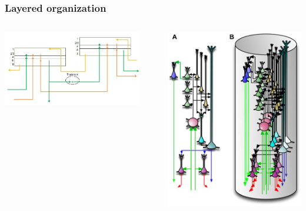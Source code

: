\documentclass[default]{beamer}
\begin{document}
	\begin{frame}
		\frametitle{Layered organization}
		
		\begin{columns}
			\begin{column}{0.65\textwidth}
				\includegraphics[width=0.9\textwidth]{mpf/regions_connect}
			\end{column}
			\begin{column}{0.35\textwidth}
				\includegraphics[width=\textwidth]{phisio/column}
			\end{column}
		\end{columns}
	\end{frame}
	
\end{document}
